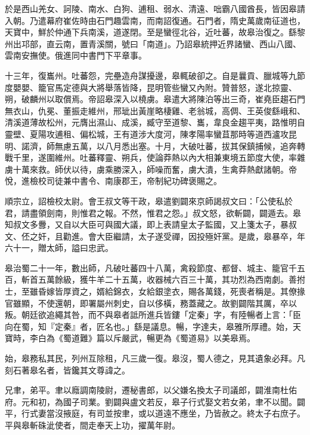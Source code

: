 \begin{pinyinscope}
 於是西山羌女、訶陵、南水、白狗、逋租、弱水、清遠、咄霸八國酋長，皆因皋請入朝。乃遣幕府崔佐時由石門趣雲南，而南詔復通。石門者，隋史萬歲南征道也，天寶中，鮮於仲通下兵南溪，道遂閉。至是蠻徑北谷，近吐蕃，故皋治復之。繇黎州出邛部，直云南，置青溪關，號曰「南道」。乃詔皋統押近界諸蠻、西山八國、雲南安撫使。俄進同中書門下平章事。



 十三年，復巂州。吐蕃怨，完壘造舟謀擾邊，皋輒破卻之。自是曩貢、臘城等九節度嬰嬰、籠官馬定德與大將舉落皆降，昆明管些蠻又內附。贊普怒，遂北掠靈、朔，破麟州以取償焉。帝詔皋深入以橈虜。皋遣大將陳泊等出三奇，崔堯臣趨石門無衣山，仇冕、董振走維州，邢玼出黃崖略棲雞、老翁城，高倜、王英俊繇峨和、清溪道薄故松州，元膺出濕山、成溪，臧守至道黎、巂，韋良金趨平夷，路惟明自靈壁、夏陽攻逋租、偏松城，王有道涉大度河，陳孝陽率蠻苴那時等道西瀘攻昆明、諾濟，師無慮五萬，以八月悉出塞。十月，大破吐蕃，拔其保鎮捕候，追奔轉戰千里，遂圍維州。吐蕃釋靈、朔兵，使論莽熱以內大相兼東境五節度大使，率雜虜十萬來救。師伏以待，虜乘勝深入，師噪而奮，虜大潰，生禽莽熱獻諸朝。帝悅，進檢校司徒兼中書令、南康郡王，帝制紀功碑褒賜之。



 順宗立，詔檢校太尉。會王叔文等干政，皋遣劉闢來京師謁叔文曰：「公使私於君，請盡領劍南，則惟君之報。不然，惟君之怨。」叔文怒，欲斬闢，闢遁去。皋知叔文多釁，又自以大臣可與國大議，即上表請皇太子監國，又上箋太子，暴叔文、伾之奸，且勸進。會大臣繼請，太子遂受禪，因投殛奸黨。是歲，皋暴卒，年六十一，贈太師，謚曰忠武。



 皋治蜀二十一年，數出師，凡破吐蕃四十八萬，禽殺節度、都督、城主、籠官千五百，斬首五萬餘級，獲牛羊二十五萬，收器械六百三十萬，其功烈為西南劇。善拊士，至雖昏嫁皆厚資之，婿給錦衣，女給銀塗衣，賜各萬錢，死喪者稱是。其僚掾官雖顯，不使還朝，即署屬州刺史，自以侈橫，務蓋藏之。故劉闢階其厲，卒以叛。朝廷欲追繩其咎，而不與皋者詆所進兵皆鏤「定秦」字，有陸暢者上言：「臣向在蜀，知『定秦』者，匠名也。」繇是議息。暢，字達夫，皋雅所厚禮。始，天寶時，李白為《蜀道難》篇以斥嚴武，暢更為《蜀道易》以美皋焉。



 始，皋務私其民，列州互除租，凡三歲一復。皋沒，蜀人德之，見其遺象必拜。凡刻石著皋名者，皆鑱其文尊諱之。



 兄聿，弟平。聿以廕調南陵尉，遷秘書郎，以父嫌名換太子司議郎，闢淮南杜佑府。元和初，為國子司業。劉闢與盧文若反，皋子行式娶文若女弟，聿不以聞。闢平，行式妻當沒掖庭，有司並按聿，或以道遠不應坐，乃皆赦之。終太子右庶子。平與皋斬硃泚使者，間走奉天上功，擢萬年尉。




\end{pinyinscope}

